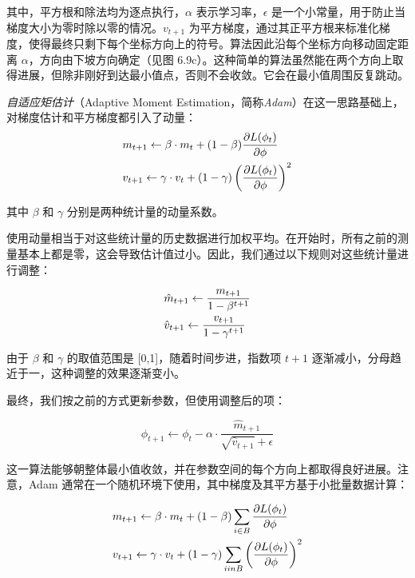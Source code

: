 \documentclass[lang=cn,newtx,10pt,scheme=chinese]{elegantbook}
\begin{document}
其中，平方根和除法均为逐点执行，\(\alpha\) 表示学习率，\(\epsilon\) 是一个小常量，用于防止当梯度大小为零时除以零的情况。\(v_{t+1}\) 为平方梯度，通过其正平方根来标准化梯度，使得最终只剩下每个坐标方向上的符号。算法因此沿每个坐标方向移动固定距离 \(\alpha\)，方向由下坡方向确定（见图 6.9c）。这种简单的算法虽然能在两个方向上取得进展，但除非刚好到达最小值点，否则不会收敛。它会在最小值周围反复跳动。

\textit{自适应矩估计}（Adaptive Moment Estimation，简称\textit{Adam}）在这一思路基础上，对梯度估计和平方梯度都引入了动量：
\begin{align}
&m_{t+1} \leftarrow \beta \cdot m_t + (1 - \beta) \frac{\partial L(\phi_t)}{\partial \phi} \notag \\
&v_{t+1} \leftarrow \gamma \cdot v_t + (1 - \gamma) \left( \frac{\partial L(\phi_t)}{\partial \phi} \right)^2
\end{align}

其中 \(\beta\) 和 \(\gamma\) 分别是两种统计量的动量系数。

使用动量相当于对这些统计量的历史数据进行加权平均。在开始时，所有之前的测量基本上都是零，这会导致估计值过小。因此，我们通过以下规则对这些统计量进行调整：

\begin{align}
& \hat{m}_{t+1} \leftarrow \frac{m_{t+1}}{1 - \beta^{t+1}} \notag \\
& \hat{v}_{t+1} \leftarrow \frac{v_{t+1}}{1 - \gamma^{t+1}} 
\end{align}


由于 \(\beta\) 和 \(\gamma\) 的取值范围是 [0,1]，随着时间步进，指数项 \(t+1\) 逐渐减小，分母趋近于一，这种调整的效果逐渐变小。

最终，我们按之前的方式更新参数，但使用调整后的项：

\begin{equation}
\phi_{t+1} \leftarrow \phi_t - \alpha \cdot \frac{\hat{m}_{t+1}}{\sqrt{\hat{v}_{t+1}} + \epsilon} 
\end{equation}

这一算法能够朝整体最小值收敛，并在参数空间的每个方向上都取得良好进展。注意，Adam 通常在一个随机环境下使用，其中梯度及其平方基于小批量数据计算：

\begin{align}
&m_{t+1} \leftarrow \beta \cdot m_t + (1 - \beta) \sum_{i \in B} \frac{\partial L(\phi_t)}{\partial \phi} \notag \\
&v_{t+1} \leftarrow \gamma \cdot v_t + (1 - \gamma) \sum_{i in B} \left( \frac{\partial L(\phi_t)}{\partial \phi} \right)^2 
\end{align}
\end{document}
